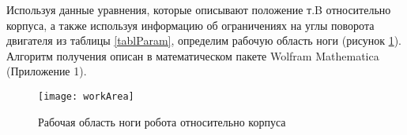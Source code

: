 Используя данные уравнения, которые описывают положение т.B относительно корпуса, а также используя информацию об ограничениях на углы поворота двигателя из таблицы \ref{tablParam}, определим рабочую область ноги (рисунок \ref{workArea}). Алгоритм получения описан в математическом пакете Wolfram Mathematica (Приложение 1). %
\newpage
\begin{figure}[h!]
	\begin{center}
		\texttt{[image: workArea]}
		\caption{Рабочая область ноги робота относительно корпуса}
		\label{workArea}
	\end{center}
\end{figure}

